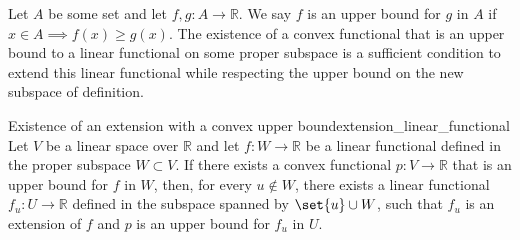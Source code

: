 Let \(A\) be some set and let \(f, g : A \to \mathbb{R}\). We say \(f\) is an upper bound for \(g\) in \(A\) if \(x \in A \implies f(x) \geq g(x)\). The existence of a convex functional that is an upper bound to a linear functional on some proper subspace is a sufficient condition to extend this linear functional while respecting the upper bound on the new subspace of definition.
\begin{lemma}{Existence of an extension with a convex upper bound}{extension_linear_functional}
    Let \(V\) be a linear space over \(\mathbb{R}\) and let \(f : W \to \mathbb{R}\) be a linear functional defined in the proper subspace \(W \subset V\). If there exists a convex functional \(p : V \to \mathbb{R}\) that is an upper bound for \(f\) in \(W\), then, for every \(u \notin W\), there exists a linear functional \(f_u : U \to \mathbb{R}\) defined in the subspace spanned by \(\set{u} \cup W\), such that \(f_u\) is an extension of \(f\) and \(p\) is an upper bound for \(f_u\) in \(U\).
\end{lemma}
